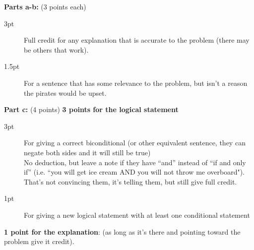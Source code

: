\documentclass[homework, problems]{../../latex-common/cs151-common}
\begin{document}
\begin{rubric}
    \textbf{Parts a-b:} (3 points each)
    \begin{description}
        \item[3pt] Full credit for any explanation that is accurate to the problem (there may be others that work).
        \item[1.5pt] For a sentence that has some relevance to the problem, but isn't a reason the pirates would be upset.
    \end{description}

    \textbf{Part c:} (4 points)
    \textbf{3 points for the logical statement} 
    \begin{description}
        \item[3pt] For giving a correct biconditional (or other equivalent sentence, they can negate both sides and it will still be true) \\
        No deduction, but leave a note if they have ``and'' instead of ``if and only if'' (i.e. ``you will get ice cream AND you will not throw me overboard"). That's not convincing them, it's telling them, but still give full credit.
        \item[1pt] For giving a new logical statement with at least one conditional statement 
    \end{description}
        
    \textbf{1 point for the explanation}: (as long as it's there and pointing toward the problem give it credit). 
\end{rubric}
\end{document}
